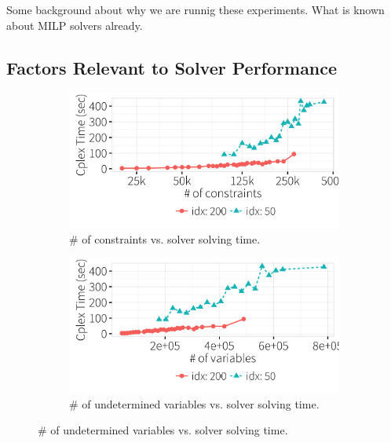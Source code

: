 Some background about why we are runnig these experiments.  What is known about MILP solvers already.

\subsection{Factors Relevant to Solver Performance}

\iffalse
  \begin{figure}[t]
  \centering
      \begin{subfigure} [t]{.3\textwidth}
    \includegraphics[width = .99\columnwidth]{figures/num_cons_time}
    \vspace*{-.25in}
    \caption{\# of constraints vs. solver solving time.}
    \vspace*{-.1in}
    \label{f:cons_vs_time} 
    \end{subfigure}
    \begin{subfigure} [t]{.3\textwidth}
    \includegraphics[width = .99\columnwidth]{figures/num_vars_time}
    \vspace*{-.25in}
    \caption{\# of undetermined variables vs. solver solving time.}
    \vspace*{-.1in}
    \label{f:var_vs_time} 
    \end{subfigure}

\end{figure}
